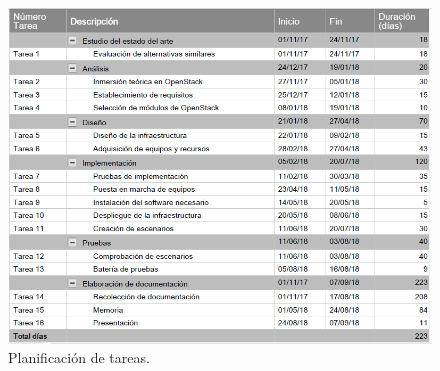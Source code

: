 \begin{figure}
    \centering
    \includegraphics[width=1\textwidth]{imagenes/capitulo3/tareas.png}
    \caption{Planificación de tareas.}
	\vspace{0.3cm}
    \label{fig:tareas}
\end{figure}

